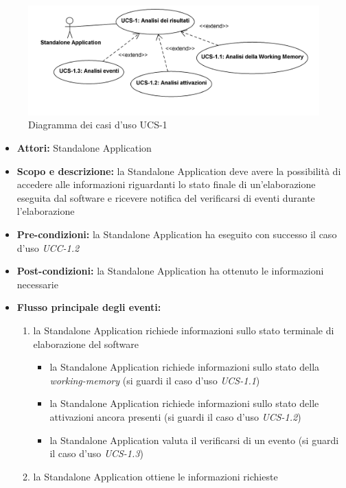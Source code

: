 
\begin{figure}
\centering
\includegraphics[width=1.1\textwidth]{Immagini/Capitolo2/UseCases/UCS-1.png}
\caption{Diagramma dei casi d'uso UCS-1}\label{fig:uc-ucs-1}
\end{figure}

\begin{itemize}
	\item \textbf{Attori:} Standalone Application
	\item \textbf{Scopo e descrizione:} la Standalone Application deve avere la possibilità di accedere alle informazioni riguardanti lo stato finale di un'elaborazione eseguita dal software e ricevere notifica del verificarsi di eventi durante l'elaborazione
	\item \textbf{Pre-condizioni:} la Standalone Application ha eseguito con successo il caso d'uso \emph{UCC-1.2}
	\item \textbf{Post-condizioni:} la Standalone Application ha ottenuto le informazioni necessarie
	\item \textbf{Flusso principale degli eventi:}
		\begin{enumerate}
			\item la Standalone Application richiede informazioni sullo stato terminale di elaborazione del software
				\begin{itemize}
					\item la Standalone Application richiede informazioni sullo stato della \emph{working-memory} (si guardi il caso d'uso \emph{UCS-1.1})
					\item la Standalone Application richiede informazioni sullo stato delle attivazioni ancora presenti (si guardi il caso d'uso \emph{UCS-1.2})
					\item la Standalone Application valuta il verificarsi di un evento (si guardi il caso d'uso \emph{UCS-1.3})
				\end{itemize}
			\item la Standalone Application ottiene le informazioni richieste
		\end{enumerate}
\end{itemize}


